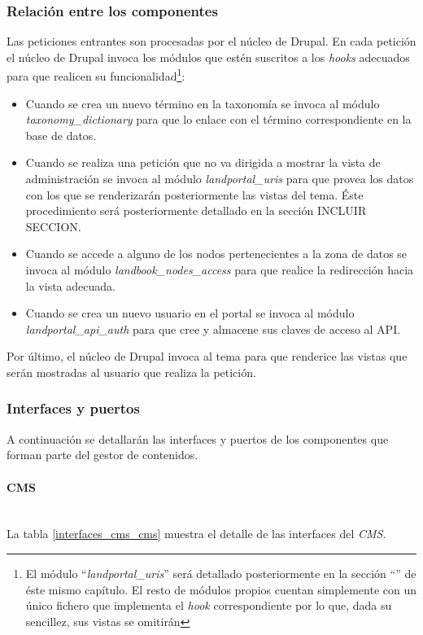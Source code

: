 \subsubsection{Relación entre los componentes}
Las peticiones entrantes son procesadas por el núcleo de Drupal.  En cada petición el núcleo de Drupal invoca los módulos que estén suscritos a los \textit{hooks} adecuados para que realicen su funcionalidad\footnote{El módulo ``\textit{landportal\_uris}'' será detallado posteriormente en la sección ``'' de éste mismo capítulo.  El resto de módulos propios cuentan simplemente con un único fichero que implementa el \textit{hook} correspondiente por lo que, dada su sencillez, sus vistas se omitirán}:
\begin{itemize}
	\item Cuando se crea un nuevo término en la taxonomía se invoca al módulo \textit{taxonomy\_dictionary} para que lo enlace con el término correspondiente en la base de datos.
	\item Cuando se realiza una petición que no va dirigida a mostrar la vista de administración se invoca al módulo \textit{landportal\_uris} para que provea los datos con los que se renderizarán posteriormente las vistas del tema.  Éste procedimiento será posteriormente detallado en la sección INCLUIR SECCION.
	\item Cuando se accede a alguno de los nodos pertenecientes a la zona de datos se invoca al módulo \textit{landbook\_nodes\_access} para que realice la redirección hacia la vista adecuada.
	\item Cuando se crea un nuevo usuario en el portal se invoca al módulo \textit{landportal\_api\_auth} para que cree y almacene sus claves de acceso al API.
\end{itemize}
Por último, el núcleo de Drupal invoca al tema para que renderice las vistas que serán mostradas al usuario que realiza la petición.


\subsubsection{Interfaces y puertos}
A continuación se detallarán las interfaces y puertos de los componentes que forman parte del gestor de contenidos. 

\paragraph{CMS} \hfill \\
La tabla \ref{interfaces_cms_cms} muestra el detalle de las interfaces del \textit{CMS}.


